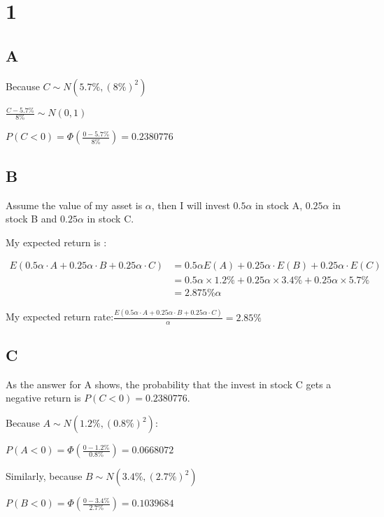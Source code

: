 \documentclass{article}
\begin{document}
	\section*{1}
	\subsection*{A}\noindent

	Because $C\sim N(5.7\%,(8\%)^2)$
	
	$\frac{C-5.7\%}{8\%}\sim N(0,1)$
	
	$P(C<0)=\Phi(\frac{0-5.7\%}{8\%})=0.2380776$
	
	\subsection*{B}\noindent
	
	Assume the value of my asset is $\alpha$, then I will invest $0.5\alpha$ in stock A, $0.25\alpha$ in stock B and $0.25\alpha$ in stock C.
	
	My expected return is :
	
	\begin{equation*}
		\begin{split}
	E(0.5\alpha\cdot A+0.25\alpha\cdot B+0.25\alpha\cdot C)&=0.5\alpha E(A)+0.25\alpha\cdot E(B)+0.25\alpha\cdot E(C)\\
			&=0.5\alpha\times 1.2\%	+ 0.25\alpha\times 3.4\%+0.25\alpha\times 5.7\%\\
			&=2.875\%\alpha	
		\end{split}
	\end{equation*}
	
	My expected return rate:$\frac{E(0.5\alpha\cdot A+0.25\alpha\cdot B+0.25\alpha\cdot C)}{\alpha}=2.85\%$
	
	\subsection*{C}\noindent
	
	As the answer for A shows, the probability that the invest in stock C gets a negative return is $P(C<0)=0.2380776$.
	
	Because  $A\sim N(1.2\%,(0.8\%)^2)$:
	
	$P(A<0)=\Phi(\frac{0-1.2\%}{0.8\%})=0.0668072$
	
	Similarly, because $B\sim N(3.4\%,(2.7\%)^2)$

	$P(B<0)=\Phi(\frac{0-3.4\%}{2.7\%})=0.1039684$
	
	\hspace*	{\fill}
	
\end{document}
